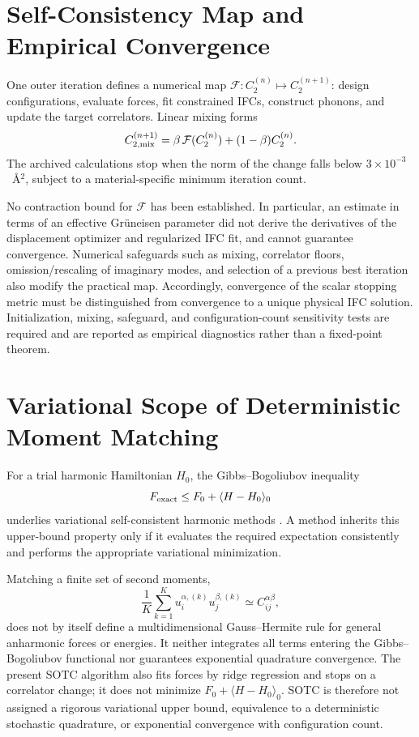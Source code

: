 \documentclass[aps,prb,reprint,amsmath,amssymb,floatfix]{revtex4-2}
\begin{document}
\color{revisionblue}
\section{Self-Consistency Map and Empirical Convergence}
\label{appendix-f-self-consistency-fixed-point-analysis-and-convergence}
\color{black}

\color{revisionblue}
One outer iteration defines a numerical map
\(\mathcal F:C_2^{(n)}\mapsto C_2^{(n+1)}\): design configurations,
evaluate forces, fit constrained IFCs, construct phonons, and update the target
correlators. Linear mixing forms
\[
C_{2,\rm mix}^{(n+1)}
=\beta\,\mathcal F(C_2^{(n)})+(1-\beta)C_2^{(n)} .
\]
The archived calculations stop when the norm of the change falls below
\(3\times10^{-3}\)~Å\(^2\), subject to a material-specific minimum iteration
count.
\color{black}

\color{revisionblue}
No contraction bound for \(\mathcal F\) has been established. In particular,
an estimate in terms of an effective Gr\"uneisen parameter did not
derive the derivatives of the displacement optimizer and regularized IFC fit,
and cannot guarantee convergence. Numerical safeguards such as mixing,
correlator floors, omission/rescaling of imaginary modes, and selection of a
previous best iteration also modify the practical map. Accordingly,
convergence of the scalar stopping metric must be distinguished from
convergence to a unique physical IFC solution. Initialization, mixing,
safeguard, and configuration-count sensitivity tests are required and are
reported as empirical diagnostics rather than a fixed-point theorem.
\color{black}

\color{revisionblue}
\section{Variational Scope of Deterministic Moment Matching}
\label{appendix-g-variational-scope-of-deterministic-moment-matching}
\color{black}

\color{revisionblue}
For a trial harmonic Hamiltonian \(H_0\), the Gibbs--Bogoliubov inequality
\[
F_{\rm exact}\leq F_0+\langle H-H_0\rangle_0
\]
underlies variational self-consistent harmonic methods
\cite{ref7,ref8,ref50}. A method inherits this upper-bound property only if it
evaluates the required expectation consistently and performs the appropriate
variational minimization.
\color{black}

\color{revisionblue}
Matching a finite set of second moments,
\[
\frac{1}{K}\sum_{k=1}^{K}u_i^{\alpha,(k)}u_j^{\beta,(k)}
 \simeq C_{ij}^{\alpha\beta},
\]
does not by itself define a multidimensional Gauss--Hermite rule for general
anharmonic forces or energies. It neither integrates all terms entering the
Gibbs--Bogoliubov functional nor guarantees exponential quadrature convergence.
The present SOTC algorithm also fits forces by ridge regression and stops on a
correlator change; it does not minimize \(F_0+\langle H-H_0\rangle_0\).
SOTC is therefore not assigned a rigorous variational upper bound,
equivalence to a deterministic stochastic quadrature, or exponential
convergence with configuration count.
\color{black}
\end{document}
